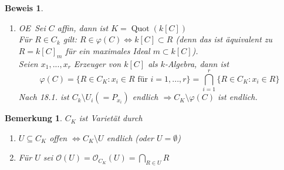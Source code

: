 \documentclass[a4paper,12pt]{report}
\theoremstyle{break}
\newtheorem{Bem}[Def]{Bemerkung}
\theoremstyle{nonumberbreak}
\theoremstyle{nonumberplain}
\newtheorem{Bew}{Beweis}
\DeclareMathOperator{\Quot}{Quot}
\renewcommand{\OE}{O\!\!E~}
\begin{document}
\begin{Bew}
\begin{enumerate}
\item[c)] \OE Sei $C$ affin, dann ist $K=\Quot(k[C])$\\
Für $R\in C_k$ gilt: $R\in\varphi(C)\Leftrightarrow k[C]\subset R$ (denn das ist äquivalent zu $R=k[C]_m$ für ein maximales Ideal $m\subset k[C]$).\\
Seien $x_1,...,x_r$ Erzeuger von $k[C]$ als $k$-Algebra, dann ist 
$$\varphi(C)=\{R\in C_K:x_i\in R\text{ für } i=1,...,r\}=\bigcap_{i=1}^r\{R\in C_K:x_i\in R\}$$
Nach 18.1. ist $C_k\setminus U_i(= P_{x_i})$ endlich $\Rightarrow C_K\setminus\varphi(C)$ ist endlich.
\end{enumerate}
\end{Bew}


\begin{Bem}
\label{bem:18.3}
$C_K$ ist Varietät durch \\
\begin{enumerate}
\item $U\subseteq C_K$ offen $\Leftrightarrow C_K\setminus U$ endlich (oder $U=\emptyset$)
\item Für $U$ sei $\mathcal O(U)=\mathcal O_{C_K}(U)=\bigcap_{R\in U}R$
\end{enumerate}
\end{Bem}
\end{document}
